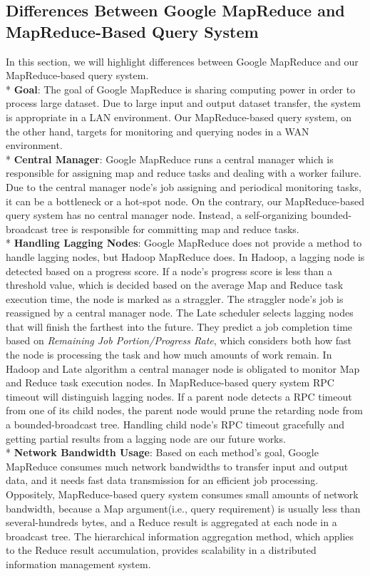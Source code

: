 \documentclass{acm_proc_article-sp}
\begin{document}
\subsection{Differences Between Google MapReduce and MapReduce-Based Query System}
In this section, we will highlight differences between Google MapReduce and our MapReduce-based query system.\\*
\textbf{Goal}: The goal of Google MapReduce is sharing computing power in order to process large dataset\cite{google_mapreduce}. Due to large input and output dataset transfer, the system is appropriate in a LAN environment.
Our MapReduce-based query system, on the other hand, targets for monitoring and querying nodes in a WAN environment.\\*
\textbf{Central Manager}: Google MapReduce runs a central manager which is responsible for assigning map and reduce tasks and dealing with a  worker failure.
Due to the central manager node's job assigning and periodical monitoring tasks, it can be a bottleneck or a hot-spot node. 
On the contrary, our MapReduce-based query system has no central manager node. Instead, a self-organizing bounded-broadcast tree is responsible for committing map and reduce tasks.\\*
\textbf{Handling Lagging Nodes}: Google MapReduce does not provide a method to handle lagging nodes, but Hadoop MapReduce does. In Hadoop, a lagging node is detected based on a progress score.
If a node's progress score is less than a threshold value, which is decided based on the average Map and Reduce task execution time, the node is marked as a straggler. The straggler node's job is reassigned by a central manager node\cite{hadoop}.
The Late scheduler\cite{late} selects lagging nodes that will finish the farthest into the future. They predict a job completion time based on \textit{Remaining Job Portion/Progress Rate}, which considers both
how fast the node is processing the task and how much amounts of work remain. 
In Hadoop and Late algorithm a central manager node is obligated to monitor Map and Reduce task execution nodes. 
In MapReduce-based query system RPC timeout will distinguish lagging nodes. If a parent node detects a RPC timeout from one of its child nodes, the parent node would prune the retarding node from a bounded-broadcast tree.
Handling child node's RPC timeout gracefully and getting partial results from a lagging node are our future works.\\*
\textbf{Network Bandwidth Usage}: Based on each method's goal, Google MapReduce consumes much network bandwidths to transfer input and output data, and it needs fast data transmission for an efficient job processing. 
Oppositely, MapReduce-based query system consumes small amounts of network bandwidth, because a Map argument(i.e., query requirement) is usually less than several-hundreds bytes, and a Reduce result is aggregated at each node in a broadcast tree.
The hierarchical information aggregation method, which applies to the Reduce result accumulation, provides scalability in a distributed information management system.\cite{astrobe}\cite{treedatamanage}
\end{document}

